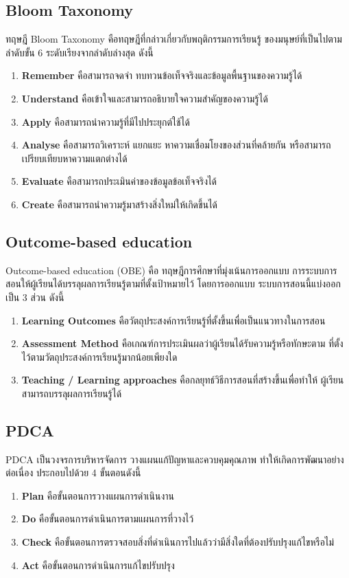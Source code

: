 \documentclass[12pt,oneside,openright,a4paper]{cpe-thai-project}
\begin{document}
\pagebreak
\subsection{Bloom Taxonomy}
ทฤษฎี Bloom Taxonomy คือทฤษฎีที่กล่าวเกี่ยวกับพฤติกรรมการเรียนรู้
ของมนุษย์ที่เป็นไปตามลำดับขั้น 6 ระดับเรียงจากลำดับล่างสุด ดังนี้

\begin{enumerate}
  \item \textbf{Remember} คือสามารถจดจำ ทบทวนข้อเท็จจริงและข้อมูลพื้นฐานของความรู้ได้
  \item \textbf{Understand} คือเข้าใจและสามารถอธิบายใจความสำคัญของความรู้ได้
  \item \textbf{Apply} คือสามารถนำความรู้ที่มีไปประยุกต์ใช้ได้
  \item \textbf{Analyse} คือสามารถวิเคราะห์ แยกแยะ หาความเชื่อมโยงของส่วนที่คล้ายกัน
  หรือสามารถเปรียบเทียบหาความแตกต่างได้ 
  \item \textbf{Evaluate} คือสามารถประเมินค่าของข้อมูลข้อเท็จจริงได้
  \item \textbf{Create} คือสามารถนำความรู้มาสร้างสิ่งใหม่ให้เกิดขึ้นได้
\end{enumerate}


\subsection{Outcome-based education}
Outcome-based education (OBE) คือ ทฤษฎีการศึกษาที่มุ่งเน้นการออกแบบ
การระบบการสอนให้ผู้เรียนได้บรรลุผลการเรียนรู้ตามที่ตั้งเป้าหมายไว้ โดยการออกแบบ
ระบบการสอนนี้แบ่งออกเป็น 3 ส่วน ดังนี้
\begin{enumerate}
  \item \textbf{Learning Outcomes} คือวัตถุประสงค์การเรียนรู้ที่ตั้งขึ้นเพื่อเป็นแนวทางในการสอน
  \item \textbf{Assessment Method} คือเกณฑ์การประเมินผลว่าผู้เรียนได้รับความรู้หรือทักษะตาม
  ที่ตั้งไว้ตามวัตถุประสงค์การเรียนรู้มากน้อยเพียงใด
  \item \textbf{Teaching / Learning approaches} คือกลยุทธ์วิธีการสอนที่สร้างขึ้นเพื่อทำให้
  ผู้เรียนสามารถบรรลุผลการเรียนรู้ได้
\end{enumerate}


\subsection{PDCA}
PDCA เป็นวงจรการบริหารจัดการ วางแผนแก้ปัญหาและควบคุมคุณภาพ ทำให้เกิดการพัฒนาอย่างต่อเนื่อง ประกอบไปด้วย 4 ขั้นตอนดังนี้
\begin{enumerate}
  \item \textbf{Plan} คือขั้นตอนการวางแผนการดำเนินงาน
  \item \textbf{Do} คือขั้นตอนการดำเนินการตามแผนการที่วางไว้
  \item \textbf{Check} คือขั้นตอนการตรวจสอบสิ่งที่ดำเนินการไปแล้วว่ามีสิ่งใดที่ต้องปรับปรุงแก้ไขหรือไม่
  \item \textbf{Act} คือขั้นตอนการดำเนินการแก้ไขปรับปรุง
\end{enumerate}
\end{document}

